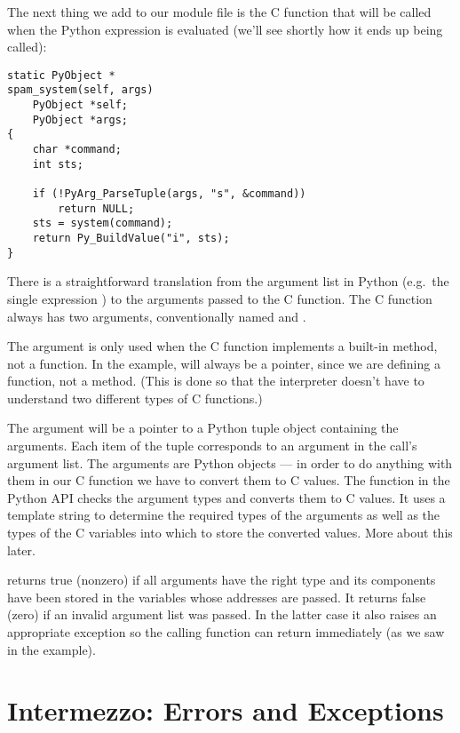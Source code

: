 \documentclass{manual}
\begin{document}
The next thing we add to our module file is the C function that will
be called when the Python expression 
is evaluated (we'll see shortly how it ends up being called):

\begin{verbatim}
static PyObject *
spam_system(self, args)
    PyObject *self;
    PyObject *args;
{
    char *command;
    int sts;

    if (!PyArg_ParseTuple(args, "s", &command))
        return NULL;
    sts = system(command);
    return Py_BuildValue("i", sts);
}
\end{verbatim}

There is a straightforward translation from the argument list in
Python (e.g.\ the single expression ) to the arguments
passed to the C function.  The C function always has two arguments,
conventionally named  and .

The  argument is only used when the C function implements a
built-in method, not a function. In the example,  will
always be a \NULL{} pointer, since we are defining a function, not a
method.  (This is done so that the interpreter doesn't have to
understand two different types of C functions.)

The  argument will be a pointer to a Python tuple object
containing the arguments.  Each item of the tuple corresponds to an
argument in the call's argument list.  The arguments are Python
objects --- in order to do anything with them in our C function we have
to convert them to C values.  The function 
in the Python API checks the argument types and converts them to C
values.  It uses a template string to determine the required types of
the arguments as well as the types of the C variables into which to
store the converted values.  More about this later.

 returns true (nonzero) if all arguments have
the right type and its components have been stored in the variables
whose addresses are passed.  It returns false (zero) if an invalid
argument list was passed.  In the latter case it also raises an
appropriate exception so the calling function can return
\NULL{} immediately (as we saw in the example).


\section{Intermezzo: Errors and Exceptions
         \label{errors}}
\end{document}
